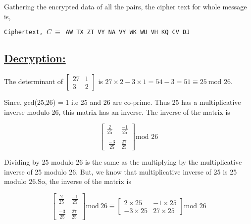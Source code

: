\documentclass[a4paper,12pt]{article}
\begin{document}
    \begin{center}
    \end{center}

    Gathering the encrypted data of all the pairs, the cipher text for whole message is,

    \begin{center}
        \texttt{Ciphertext, $C\ \equiv$
        AW TX ZT VY NA VY WK WU VH KQ CV DJ}
    \end{center}

    \begin{tcolorbox}
        \subsection*{\underline{Decryption:}}

    The determinant of $\begin{bmatrix}
        27 & 1 \\
        3 & 2
    \end{bmatrix}$ is $27\times 2 - 3\times 1 = 54-3 = 51 \equiv 25\ \mbox{mod 26}$.

    \vspace*{0.3cm}

    Since, gcd(25,26) = 1 i.e 25 and 26 are co-prime. Thus 25 has a multiplicative inverse modulo 26, this matrix has an inverse. The inverse of the matrix is 

    
    $$\begin{bmatrix}
        \frac{2}{25} & \frac{-1}{25} \\\\\
        \frac{-3}{25} & \frac{27}{25}
    \end{bmatrix}\mbox{mod 26}$$

    Dividing by 25 modulo 26 is the same as the multiplying by the multiplicative inverse of 25 modulo 26.
    But, we know that multiplicative inverse of 25 is 25 modulo 26.So, the inverse of the matrix is

    \begin{equation*}
        \begin{bmatrix}
            \frac{2}{25} & \frac{-1}{25}\\\\
            \frac{-3}{25} & \frac{27}{25}
        \end{bmatrix}\mbox{mod}\ 26 \equiv \begin{bmatrix}
            2\times 25 & -1\times 25 \\
            -3\times 25 & 27\times 25
        \end{bmatrix}\mbox{mod 26}
    \end{equation*}


\end{tcolorbox}
\end{document}
